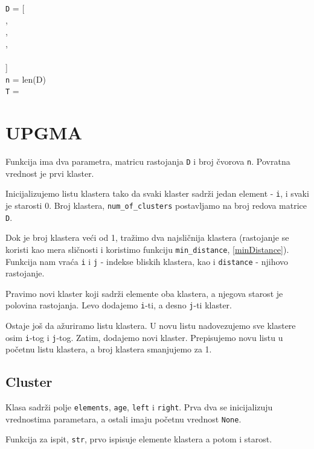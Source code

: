 \noindent \texttt{D} = [
\\\indent[0,  13, 21, 22],
\\\indent[13,  0, 12, 13],
\\\indent[21, 12,  0, 13],
\\\indent[22, 13, 13,  0]
\\]
\\\texttt{n} = len(D)
\\\texttt{T} = 


\section{UPGMA}

Funkcija ima dva parametra, matricu rastojanja \texttt{D} i broj čvorova \texttt{n}. Povratna vrednost je prvi klaster.

Inicijalizujemo listu klastera tako da svaki klaster sadrži jedan element - \texttt{i}, i svaki je starosti 0. Broj klastera, \texttt{num\_of\_clusters} postavljamo na broj redova matrice \texttt{D}.

Dok je broj klastera veći od 1, tražimo dva najsličnija klastera (rastojanje se koristi kao mera sličnosti i koristimo funkciju \texttt{min\_distance}, \ref{minDistance}). Funkcija nam vraća \texttt{i} i \texttt{j} - indekse bliskih klastera, kao i \texttt{distance} - njihovo rastojanje. 

Pravimo novi klaster koji sadrži elemente oba klastera, a njegova starost je polovina rastojanja. Levo dodajemo \texttt{i}-ti, a desno \texttt{j}-ti klaster. 

Ostaje još da ažuriramo listu klastera. U novu listu nadovezujemo sve klastere osim \texttt{i}-tog i \texttt{j}-tog. Zatim, dodajemo novi klaster. Prepisujemo novu listu u početnu listu klastera, a broj klastera smanjujemo za 1.




\subsection{Cluster}
\label{cluster}

Klasa sadrži polje \texttt{elements}, \texttt{age}, \texttt{left} i \texttt{right}. Prva dva se inicijalizuju vrednostima parametara, a ostali imaju početnu vrednost \texttt{None}.

Funkcija za ispit, \texttt{str}, prvo ispisuje elemente klastera a potom i starost.

